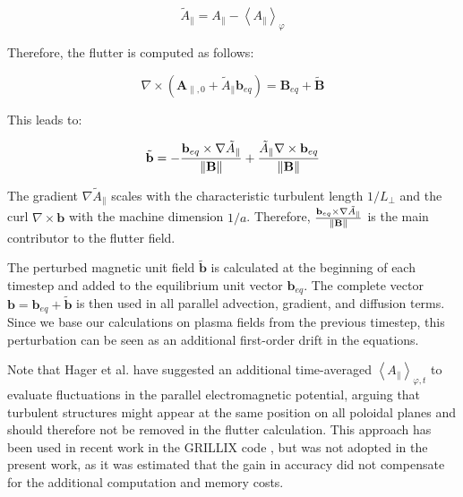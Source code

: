 \begin{equation}
	\tilde{A}_\parallel = A_\parallel - \left<A_\parallel\right>_\varphi \label{eq:averagedAParallel}
\end{equation}

Therefore, the flutter is computed as follows: \newline

\begin{equation}
	\nabla \times \left( \mathbf{A}_{\parallel,0} + \tilde{A}_\parallel \mathbf{b}_{eq} \right) = \mathbf{B}_{eq} + \tilde{\mathbf{B}} 
	\label{eq:definitionMagneticFieldWithFlutter}
\end{equation}

This leads to: \newline

\begin{equation}
	\tilde{\mathbf{b}} = - \frac{\mathbf{b}_{eq} \times \nabla \tilde{A}_\parallel}{\norm{\mathbf{B}}} + \frac{\tilde{A}_\parallel \nabla \times \mathbf{b}_{eq}}{\norm{\mathbf{B}}}
	\label{eq:definitionMagneticFieldWithFlutter_1}
\end{equation}

The gradient $\nabla \tilde{A}_\parallel$ scales with the characteristic turbulent length $1/L_\perp$ and the curl $\nabla \times \mathbf{b}$ with the machine dimension $1/a$. Therefore, $\frac{\mathbf{b}_{eq} \times \nabla \tilde{A}_\parallel}{\norm{\mathbf{B}}}$ is the main contributor to the flutter field. \newline

The perturbed magnetic unit field $\tilde{\mathbf{b}}$ is calculated at the beginning of each timestep and added to the equilibrium unit vector $\mathbf{b}_{eq}$. The complete vector $\mathbf{b} = \mathbf{b}_{eq} + \tilde{\mathbf{b}}$ is then used in all parallel advection, gradient, and diffusion terms. Since we base our calculations on plasma fields from the previous timestep, this perturbation can be seen as an additional first-order drift in the equations. \newline

Note that Hager et al. \cite{hager2022} have suggested an additional time-averaged $\left<A_\parallel\right>_{\varphi,t}$ to evaluate fluctuations in the parallel electromagnetic potential, arguing that turbulent structures might appear at the same position on all poloidal planes and should therefore not be removed in the flutter calculation. This approach has been used in recent work in the GRILLIX code \cite{zhang2024}, but was not adopted in the present work, as it was estimated that the gain in accuracy did not compensate for the additional computation and memory costs. \newline


